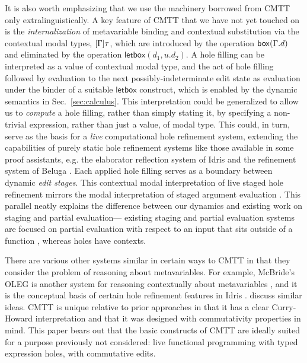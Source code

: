 It is also worth emphasizing that we use the machinery 
borrowed from CMTT only extralinguistically.
%
A key feature of CMTT that we have not yet touched on is the
\emph{internalization} of metavariable binding and contextual
substitution via the contextual modal types, $[\Gamma]\tau$, which
are introduced by the operation $\mathsf{box}(\Gamma.d)$ and
eliminated by the operation $\mathsf{letbox}(d_1, u.d_2)$.
%
A hole filling can be interpreted as a value of contextual modal
type, and the act of hole filling followed by evaluation to the next
possibly-indeterminate edit state as evaluation under the binder of a
suitable $\mathsf{letbox}$ construct, which is enabled by the dynamic
semantics in Sec.~\ref{sec:calculus}.
%
This interpretation could be generalized to allow us to \emph{compute} a hole filling, rather
than simply stating it, by specifying a non-trivial expression, rather than just a value, of
modal type.
%
This could, in turn, serve as the basis for a \emph{live} computational hole
refinement system, extending the capabilities of purely static hole
refinement systems like those available in some proof assistants,
e.g. the elaborator reflection system of Idris
\cite{brady2013idris,DBLP:conf/icfp/ChristiansenB16} and the refinement system of Beluga
\cite{DBLP:conf/flops/Pientka10,pientka2015inductive}.
%
Each applied hole filling serves as a boundary between dynamic
\emph{edit stages}.
%
This contextual modal interpretation of live staged hole refinement
mirrors the modal interpretation of staged argument evaluation
\cite{Davies:2001op}. 
%
This parallel neatly explains
the difference between our dynamics and existing work on staging and
partial evaluation---
existing staging and partial evaluation systems are focused on partial evaluation with respect to an input that sits outside of a
function \cite{Jones:1993uq}, whereas holes have  contexts.

There are various other systems similar in certain ways to CMTT in 
that they consider the problem of reasoning about metavariables. 
For example, McBride's OLEG is another system for reasoning contextually about metavariables
\cite{DBLP:phd/ethos/McBride00}, and it is the conceptual basis of certain hole refinement features in Idris \cite{brady2013idris}. \citet{DBLP:conf/csl/GeuversJ02} discuss similar ideas. CMTT is unique relative to prior approaches in that it has a clear Curry-Howard interpretation and that it was designed with commutativity properties in mind.
%
This paper bears out that the basic constructs of CMTT are ideally suited for a purpose previously not considered: live functional programming with typed expression holes, with commutative edits.

